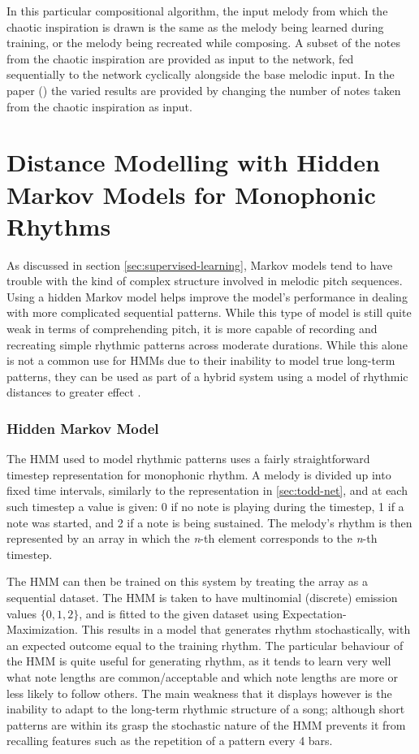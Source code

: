 \documentclass[ author={Stephen Livermore-Tozer},
				supervisor={Dr. Peter Flach},
				degree={MEng},
				title={Algorithmic Co-composition Using Machine Learning},
				subtitle={},
				type={research},
				year={2016} ]{dissertation}
\begin{document}
	In this particular compositional algorithm, the input melody from which the chaotic inspiration is drawn is the same as the melody being learned during training, or the melody being recreated while composing. A subset of the notes from the chaotic inspiration are provided as input to the network, fed sequentially to the network cyclically alongside the base melodic input. In the paper (\cite{coca2011generation}) the varied results are provided by changing the number of notes taken from the chaotic inspiration as input.
	
	\section{Distance Modelling with Hidden Markov Models for Monophonic Rhythms}
	\label{sec:distance-model}
	
	As discussed in section \ref{sec:supervised-learning}, Markov models tend to have trouble with the kind of complex structure involved in melodic pitch sequences. Using a hidden Markov model helps improve the model's performance in dealing with more complicated sequential patterns. While this type of model is still quite weak in terms of comprehending pitch, it is more capable of recording and recreating simple rhythmic patterns across moderate durations. While this alone is not a common use for HMMs due to their inability to model true long-term patterns, they can be used as part of a hybrid system using a model of rhythmic distances to greater effect \cite{paiement2007generative}.
	
	\subsubsection{Hidden Markov Model}
	
	The HMM used to model rhythmic patterns uses a fairly straightforward timestep representation for monophonic rhythm. A melody is divided up into fixed time intervals, similarly to the representation in \ref{sec:todd-net}, and at each such timestep a value is given: 0 if no note is playing during the timestep, 1 if a note was started, and 2 if a note is being sustained. The melody's rhythm is then represented by an array in which the \textit{n}-th element corresponds to the \textit{n}-th timestep.
	
	The HMM can then be trained on this system by treating the array as a sequential dataset. The HMM is taken to have multinomial (discrete) emission values $\{0,1,2\}$, and is fitted to the given dataset using Expectation-Maximization. This results in a model that generates rhythm stochastically, with an expected outcome equal to the training rhythm. The particular behaviour of the HMM is quite useful for generating rhythm, as it tends to learn very well what note lengths are common/acceptable and which note lengths are more or less likely to follow others. The main weakness that it displays however is the inability to adapt to the long-term rhythmic structure of a song; although short patterns are within its grasp the stochastic nature of the HMM prevents it from recalling features such as the repetition of a pattern every 4 bars. 
	
\end{document}
